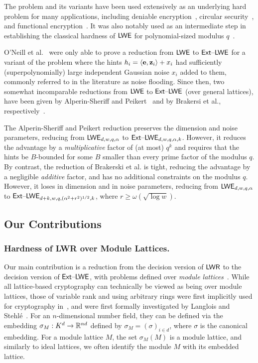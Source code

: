 \iflncs
\else
The problem and its variants have been used extensively as an
underlying hard problem for many
applications, including deniable
encryption~\cite{DBLP:conf/crypto/ONeillPW11,DBLP:conf/tcc/AponFL16},
circular security~\cite{DBLP:conf/pkc/Alperin-SheriffP12}, and
functional encryption~\cite{DBLP:conf/crypto/AgrawalLS16}. It was also
notably used as an intermediate step in establishing the classical
hardness of $\mathsf{LWE}$ for polynomial-sized modulus
$q$~\cite{DBLP:conf/stoc/BrakerskiLPRS13}.
\fi

O'Neill et al.~\cite{DBLP:conf/crypto/ONeillPW11} were only able to
prove a reduction from $\mathsf{LWE}$ to $\mathsf{Ext \text{\textendash} LWE}$ for a variant of the
problem where the hints $h_i=\langle\mathbf{e},\mathbf{z}_i\rangle+x_i$ had
sufficiently (superpolynomially) large independent Gaussian noise
$x_i$ added to them, commonly referred to in the literature as noise
flooding. Since then, two somewhat incomparable reductions from $\mathsf{LWE}$
to $\mathsf{Ext \text{\textendash} LWE}$ (over general lattices), have been given by Alperin-Sheriff and
Peikert~\cite{DBLP:conf/pkc/Alperin-SheriffP12} and by Brakersi et
al., respectively~\cite{DBLP:conf/stoc/BrakerskiLPRS13}.

The Alperin-Sheriff and Peikert reduction preserves the dimension and
noise parameters, reducing from $\mathsf{LWE}_{d,w,q,\alpha}$ to
$\mathsf{Ext \text{\textendash} LWE}_{d,w,q,\alpha,k}$. However, it reduces the advantage by a
\emph{multiplicative} factor of (at most) $q^k$ and requires that the
hints be $B$-bounded for some $B$ smaller
than every prime factor of the modulus $q$.
By contrast, the reduction of Brakerski et al. is tight, reducing the
advantage by a negligible \emph{additive} factor, and has no
additional constraints on the modulus $q$. However, it loses in
dimension and in noise parameters, reducing from $\mathsf{LWE}_{d,w,q,\alpha}$
to $\mathsf{Ext \text{\textendash} LWE}_{d+k,w,q,(\alpha^2+r^2)^{1/2},k}$, where $r \geq
  \omega(\sqrt{\log{w}})$.

\subsection{Our Contributions}

\subsubsection{Hardness of LWR over Module Lattices.}
\label{sec:hardness-lwr-over}


Our main contribution is a reduction from the decision version of
$\mathsf{LWR}$ to the decision version of $\mathsf{Ext \text{\textendash} LWE}$, with problems defined over \emph{module
lattices}~\cite{DBLP:journals/dcc/LangloisS15}. While all
lattice-based cryptography can technically be viewed as being over
module lattices, those of
variable rank and using arbitrary rings were first implicitly used for
cryptography in~\cite{DBLP:conf/innovations/BrakerskiGV12}, and were first formally investigated by Langlois and
Stehl{\'{e}}~\cite{DBLP:journals/dcc/LangloisS15}. For an
$n$-dimensional number field, they can be defined
via the embedding $\sigma_{M}: K^d \to \mathbb{R}^{nd}$ defined by $\sigma_{M} =
(\sigma)_{i \in d}$, where $\sigma$ is the canonical embedding. For a
module lattice $M$, the
set $\sigma_{M}(M)$ is a module lattice, and similarly to ideal
lattices, we often identify the module $M$ with its embedded
lattice. 

